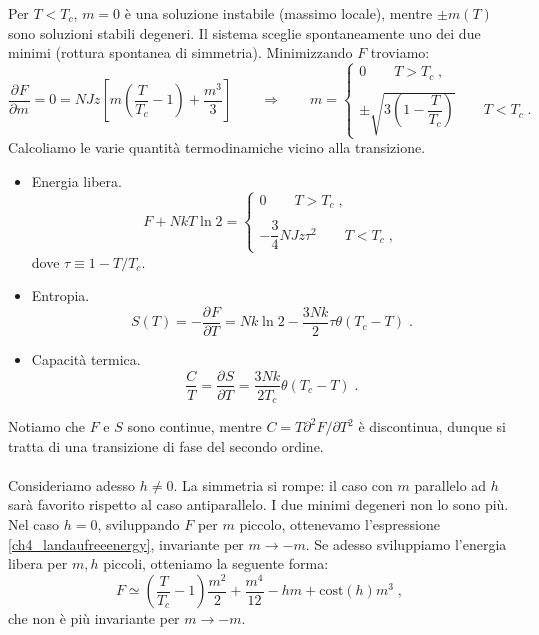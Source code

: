 \documentclass[10pt,a4paper]{report}
\theoremstyle{definition}
\newcommand{\pdev}[3][]{\frac{\partial^{#1} #2}{\partial #3^{#1}}}
\numberwithin{equation}{section}
\begin{document}
Per $T<T_c$, $m=0$ è una soluzione instabile (massimo locale), mentre $\pm m(T)$ sono soluzioni stabili degeneri. Il sistema sceglie spontaneamente uno dei due minimi (rottura spontanea di simmetria). Minimizzando $F$ troviamo:
\begin{equation}
\pdev{F}{m}=0=NJz\left[m\left(\frac{T}{T_c}-1\right)+\frac{m^3}{3}\right]\qquad \Longrightarrow \qquad m=\begin{cases}
0\qquad T>T_c\;, \\
\\
\pm \sqrt{3\left(1-\dfrac{T}{T_c}\right)}\qquad T<T_c\;.
\end{cases}
\end{equation}
Calcoliamo le varie quantità termodinamiche vicino alla transizione.
\begin{itemize}
\item Energia libera.
\begin{equation}
F+NkT\ln 2=\begin{cases}
0\qquad T>T_c\;, \\
\\
-\dfrac{3}{4}NJz\tau^2\qquad T<T_c\;,
\end{cases}
\end{equation}
dove $\tau\equiv 1-T/T_c$.
\item Entropia.
\begin{equation}
S(T)=-\pdev{F}{T}=Nk\ln 2-\frac{3Nk}{2}\tau \theta(T_c-T)\;.
\end{equation}
\item Capacità termica.
\begin{equation}
\frac{C}{T}=\pdev{S}{T}=\frac{3Nk}{2T_c}\theta(T_c-T)\;.
\end{equation}
\end{itemize}
Notiamo che $F$ e $S$ sono continue, mentre $C=T\partial^2F/\partial T^2$ è discontinua, dunque si tratta di una transizione di fase del secondo ordine. \\
\\
Consideriamo adesso $h\ne 0$. La simmetria si rompe: il caso con $m$ parallelo ad $h$ sarà favorito rispetto al caso antiparallelo. I due minimi degeneri non lo sono più. \\
Nel caso $h=0$, sviluppando $F$ per $m$ piccolo, ottenevamo l'espressione \eqref{ch4_landaufreeenergy}, invariante per $m\to -m$. Se adesso sviluppiamo l'energia libera per $m,h$ piccoli, otteniamo la seguente forma:
\begin{equation}
F\simeq \left(\frac{T}{T_c}-1\right)\frac{m^2}{2}+\frac{m^4}{12}-hm+\mathrm{cost}(h)m^3\;,
\end{equation}
che non è più invariante per $m\to -m$. \\
\end{document}
